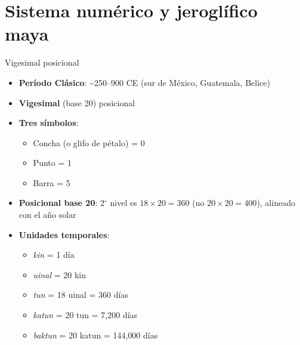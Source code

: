 \documentclass[10pt,xcolor=dvipsnames]{beamer}
\begin{document}
\section{Sistema numérico y jeroglífico maya}

\begin{frame}{Vigesimal posicional}
  \begin{itemize}
    \item \textbf{Período Clásico}: \textasciitilde 250--900 CE (sur de México, Guatemala, Belice)
    \item \textbf{Vigesimal} (base 20) posicional
    \item \textbf{Tres símbolos}:
      \begin{itemize}
        \item Concha (o glifo de pétalo) = 0
        \item Punto = 1
        \item Barra = 5
      \end{itemize}
  \item \textbf{Posicional base 20}: 2$^{\circ}$ nivel es $18 \times 20 = 360$ (no $20 \times 20 = 400$), alineado con el año solar
    \item \textbf{Unidades temporales}:
      \begin{itemize}
        \item \textit{kin} = 1 día
        \item \textit{uinal} = 20 kin
        \item \textit{tun} = 18 uinal = 360 días
        \item \textit{katun} = 20 tun = 7{,}200 días
        \item \textit{baktun} = 20 katun = 144{,}000 días
      \end{itemize}
  \end{itemize}
\end{frame}
\end{document}
